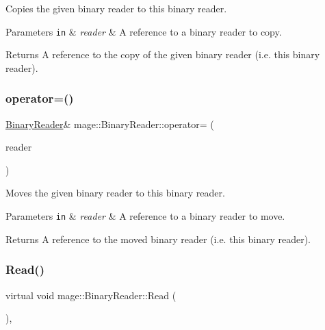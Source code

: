 Copies the given binary reader to this binary reader.


\begin{DoxyParams}[1]{Parameters}
\mbox{\tt in}  & {\em reader} & A reference to a binary reader to copy. \\
\hline
\end{DoxyParams}
\begin{DoxyReturn}{Returns}
A reference to the copy of the given binary reader (i.\+e. this binary reader). 
\end{DoxyReturn}
\hypertarget{classmage_1_1_binary_reader_abb971fe92727a0e86b3698dba8c586de}{}\label{classmage_1_1_binary_reader_abb971fe92727a0e86b3698dba8c586de} 
\subsubsection{\texorpdfstring{operator=()}{operator=()}\hspace{0.1cm}{\footnotesize\ttfamily [2/2]}}
{\footnotesize\ttfamily \hyperlink{classmage_1_1_binary_reader}{Binary\+Reader}\& mage\+::\+Binary\+Reader\+::operator= (\begin{DoxyParamCaption}\item[{\hyperlink{classmage_1_1_binary_reader}{Binary\+Reader} \&\&}]{reader }\end{DoxyParamCaption})\hspace{0.3cm}{\ttfamily [delete]}}

Moves the given binary reader to this binary reader.


\begin{DoxyParams}[1]{Parameters}
\mbox{\tt in}  & {\em reader} & A reference to a binary reader to move. \\
\hline
\end{DoxyParams}
\begin{DoxyReturn}{Returns}
A reference to the moved binary reader (i.\+e. this binary reader). 
\end{DoxyReturn}
\hypertarget{classmage_1_1_binary_reader_a5c060c165f17a71f4218eb98c7091273}{}\label{classmage_1_1_binary_reader_a5c060c165f17a71f4218eb98c7091273} 
\subsubsection{\texorpdfstring{Read()}{Read()}}
{\footnotesize\ttfamily virtual void mage\+::\+Binary\+Reader\+::\+Read (\begin{DoxyParamCaption}{ }\end{DoxyParamCaption})\hspace{0.3cm}{\ttfamily [private]}, {}}

